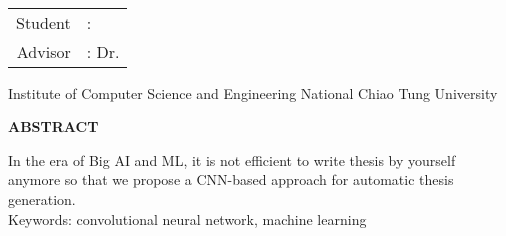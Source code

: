 \newpage
\begin{center}
  \LARGE
  \begin{singlespace}
  	\textbf{\englishTitle{}} \\[0.5cm]
  \end{singlespace}

  \begin{singlespace}
  \begin{tabular}{r l}
    Student & : \studentEnName{} \\
    Advisor & : Dr. \advisorEnName{} \\[0.5cm]
  \end{tabular}
  \end{singlespace}

  \begin{singlespace}
  Institute of Computer Science and Engineering National Chiao Tung University\\[0.5cm]
  \end{singlespace}
    
  \textbf{ABSTRACT} \\[0.5cm]	
\end{center}

\normalsize 
In the era of Big AI and ML, it is not efficient to write thesis by yourself anymore so that we propose a CNN-based approach for automatic thesis generation. \\[0.7cm]

Keywords: convolutional neural network, machine learning